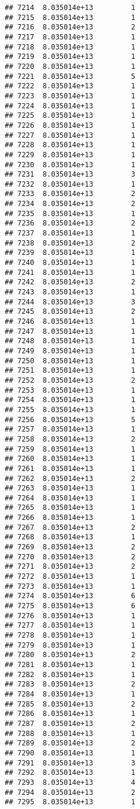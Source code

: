 \documentclass[
]{article}
\begin{document}
\begin{verbatim}
## 7214  8.035014e+13         1
## 7215  8.035014e+13         1
## 7216  8.035014e+13         2
## 7217  8.035014e+13         1
## 7218  8.035014e+13         1
## 7219  8.035014e+13         1
## 7220  8.035014e+13         1
## 7221  8.035014e+13         5
## 7222  8.035014e+13         1
## 7223  8.035014e+13         1
## 7224  8.035014e+13         1
## 7225  8.035014e+13         1
## 7226  8.035014e+13         1
## 7227  8.035014e+13         1
## 7228  8.035014e+13         1
## 7229  8.035014e+13         1
## 7230  8.035014e+13         1
## 7231  8.035014e+13         3
## 7232  8.035014e+13         1
## 7233  8.035014e+13         2
## 7234  8.035014e+13         2
## 7235  8.035014e+13         1
## 7236  8.035014e+13         2
## 7237  8.035014e+13         1
## 7238  8.035014e+13         2
## 7239  8.035014e+13         1
## 7240  8.035014e+13         1
## 7241  8.035014e+13         1
## 7242  8.035014e+13         2
## 7243  8.035014e+13         1
## 7244  8.035014e+13         3
## 7245  8.035014e+13         2
## 7246  8.035014e+13         1
## 7247  8.035014e+13         1
## 7248  8.035014e+13         1
## 7249  8.035014e+13         1
## 7250  8.035014e+13         1
## 7251  8.035014e+13         1
## 7252  8.035014e+13         2
## 7253  8.035014e+13         1
## 7254  8.035014e+13         1
## 7255  8.035014e+13         1
## 7256  8.035014e+13         5
## 7257  8.035014e+13         1
## 7258  8.035014e+13         2
## 7259  8.035014e+13         1
## 7260  8.035014e+13         1
## 7261  8.035014e+13         1
## 7262  8.035014e+13         2
## 7263  8.035014e+13         1
## 7264  8.035014e+13         1
## 7265  8.035014e+13         1
## 7266  8.035014e+13         1
## 7267  8.035014e+13         2
## 7268  8.035014e+13         1
## 7269  8.035014e+13         2
## 7270  8.035014e+13         2
## 7271  8.035014e+13         2
## 7272  8.035014e+13         1
## 7273  8.035014e+13         1
## 7274  8.035014e+13         6
## 7275  8.035014e+13         6
## 7276  8.035014e+13         1
## 7277  8.035014e+13         1
## 7278  8.035014e+13         1
## 7279  8.035014e+13         1
## 7280  8.035014e+13         2
## 7281  8.035014e+13         1
## 7282  8.035014e+13         1
## 7283  8.035014e+13         2
## 7284  8.035014e+13         1
## 7285  8.035014e+13         2
## 7286  8.035014e+13         1
## 7287  8.035014e+13         2
## 7288  8.035014e+13         1
## 7289  8.035014e+13         2
## 7290  8.035014e+13         1
## 7291  8.035014e+13         3
## 7292  8.035014e+13         1
## 7293  8.035014e+13         4
## 7294  8.035014e+13         2
## 7295  8.035014e+13         1

\end{verbatim}
\end{document}
